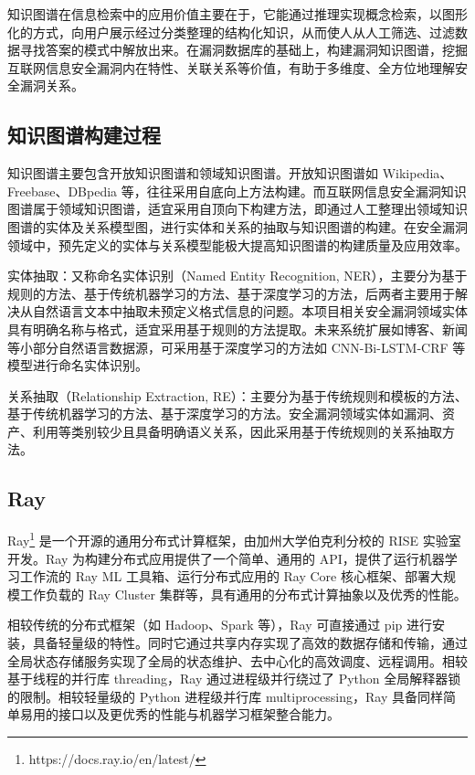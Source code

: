 \documentclass[a4paper,AutoFakeBold,oneside,12pt]{book}
\begin{document}
知识图谱在信息检索中的应用价值主要在于，它能通过推理实现概念检索，以图形化的方式，向用户展示经过分类整理的结构化知识，从而使人从人工筛选、过滤数据寻找答案的模式中解放出来。在漏洞数据库的基础上，构建漏洞知识图谱，挖掘互联网信息安全漏洞内在特性、关联关系等价值，有助于多维度、全方位地理解安全漏洞关系。

\subsection{知识图谱构建过程}

知识图谱主要包含开放知识图谱和领域知识图谱。开放知识图谱如 Wikipedia、Freebase、DBpedia 等，往往采用自底向上方法构建。而互联网信息安全漏洞知识图谱属于领域知识图谱，适宜采用自顶向下构建方法，即通过人工整理出领域知识图谱的实体及关系模型图，进行实体和关系的抽取与知识图谱的构建。在安全漏洞领域中，预先定义的实体与关系模型能极大提高知识图谱的构建质量及应用效率。\cite{zhang_survey_2021}

实体抽取：又称命名实体识别（Named Entity Recognition, NER），主要分为基于规则的方法、基于传统机器学习的方法、基于深度学习的方法\cite{zhou_survey_2020}，后两者主要用于解决从自然语言文本中抽取未预定义格式信息的问题。本项目相关安全漏洞领域实体具有明确名称与格式，适宜采用基于规则的方法提取。未来系统扩展如博客、新闻等小部分自然语言数据源，可采用基于深度学习的方法如 CNN-Bi-LSTM-CRF 等模型进行命名实体识别。

关系抽取（Relationship Extraction, RE）：主要分为基于传统规则和模板的方法、基于传统机器学习的方法、基于深度学习的方法\cite{zhou_survey_2020}。安全漏洞领域实体如漏洞、资产、利用等类别较少且具备明确语义关系，因此采用基于传统规则的关系抽取方法。

\subsection{Ray}

Ray\footnote{https://docs.ray.io/en/latest/} 是一个开源的通用分布式计算框架，由加州大学伯克利分校的 RISE 实验室开发。Ray 为构建分布式应用提供了一个简单、通用的 API，提供了运行机器学习工作流的 Ray ML 工具箱、运行分布式应用的 Ray Core 核心框架、部署大规模工作负载的 Ray Cluster 集群等，具有通用的分布式计算抽象以及优秀的性能。

相较传统的分布式框架（如 Hadoop、Spark 等），Ray 可直接通过 pip 进行安装，具备轻量级的特性。同时它通过共享内存实现了高效的数据存储和传输，通过全局状态存储服务实现了全局的状态维护、去中心化的高效调度、远程调用。相较基于线程的并行库  threading，Ray 通过进程级并行绕过了 Python 全局解释器锁的限制。相较轻量级的 Python 进程级并行库 multiprocessing，Ray 具备同样简单易用的接口以及更优秀的性能与机器学习框架整合能力。
\end{document}
